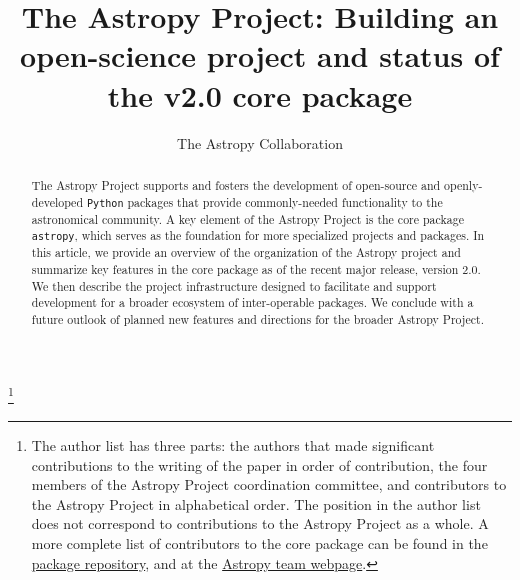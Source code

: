 \documentclass[modern]{aastex62}
\newcommand{\package}[1]{\texttt{#1}\xspace}
\newcommand{\python}{\package{Python}}
\newcommand{\astropy}{Astropy\xspace}
\newcommand{\astropypkg}{\package{astropy}}
\begin{document}
\draft{\today}

\title{The Astropy Project: Building an open-science project and status of the v2.0 core package}


\author{The Astropy Collaboration}
\noaffiliation
{\let\thefootnote\relax\footnote{{The author list has three parts: the authors that made significant contributions to the writing of the paper in order of contribution, the four members of the \astropy Project coordination committee, and contributors to the \astropy Project in alphabetical order. The position in the author list does not correspond to contributions to the \astropy Project as a whole. A more complete list of contributors to the core package can be found in the \href{https://github.com/astropy/astropy/graphs/contributors}{package repository}, and at the \href{http://www.astropy.org/team.html}{\astropy team webpage}.}}}



\begin{abstract}
The \astropy Project supports and fosters the development of open-source and openly-developed
\python packages that provide commonly-needed functionality to the astronomical
community.
A key element of the \astropy Project is the core package \astropypkg, which serves as the
foundation for more specialized projects and packages.
In this article, we provide an overview of the organization of the \astropy
project and summarize key features in the core package as of the recent major
release, version 2.0.
We then describe the project infrastructure designed to facilitate and support
development for a broader ecosystem of inter-operable packages.
We conclude with a future outlook of planned new features and directions for the
broader \astropy Project.
\end{abstract}

\end{document}
